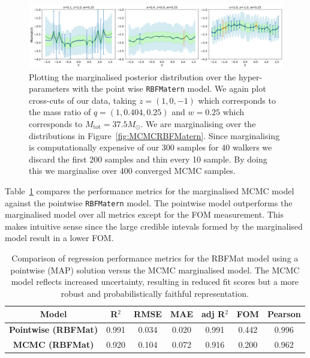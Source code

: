 \documentclass{ucdgradtaughtthesis}
\begin{document}
\begin{figure}[H]
    \centering
    \includegraphics[width=1\textwidth]{LatexPlots/final_gps_plots/MCMCpointwisecomparison_all.png}
    \caption[Comparing the pointwised  model with an alternative marginalised over its hyper-parmeters.]{Plotting the marginalised posterior distribution over the hyper-parameters with the point wise \texttt{RBFMatern} model. We again plot cross-cuts of our data, taking \(z = (1,0,-1)\) which corresponds to the mass ratio of \(q = (1,0.404,0.25)\) and \(w = 0.25\) which corresponds to \(M_{\text{tot}} = 37.5M_\odot\). We are marginalising over the distributions in Figure~\ref{fig:MCMCRBFMatern}. 
    Since marginalising is computationally expensive of our 300 samples for 40 walkers we discard the first 200 samples and thin every 10 sample. By doing this we marginalise over 400 converged MCMC samples.}
    \label{fig:MCMCvsmarginalised}
\end{figure}
%
Table~\ref{tab:pointwise_vs_mcmc} compares the performance metrics for the marginalised MCMC model against the pointwise \texttt{RBFMatern} model.
The pointwise model outperforms the marginalised model over all metrics except for the FOM measurement. This makes intuitive sense since the large credible intevals
formed by the marginalised model result in a lower FOM. 
% 
\begin{table}[H]
    \centering
    \small
    \renewcommand{\arraystretch}{1.3}
    \begin{tabular}{|c|c|c|c|c|c|c|}
    \hline
    \textbf{Model} & \textbf{R$^2$} & \textbf{RMSE} & \textbf{MAE} & \textbf{adj R$^2$} & \textbf{FOM} & \textbf{Pearson} \\
    \hline
    \textbf{Pointwise (RBFMat)} & 0.991 & 0.034 & 0.020 & 0.991 & 0.442 & 0.996 \\
    \textbf{MCMC (RBFMat)}      & 0.920 & 0.104 & 0.072 & 0.916 & 0.200 & 0.962 \\
    \hline
    \end{tabular}
    \caption[Comparing metrics between the pointwise \texttt{RBFMatern} model and its equivalent model marginalised over the hyper-parameters.]{Comparison of regression performance metrics for the RBFMat model using a pointwise (MAP) solution versus the MCMC marginalised model. The MCMC model reflects increased uncertainty, resulting in reduced fit scores but a more robust and probabilistically faithful representation.}
    \label{tab:pointwise_vs_mcmc}
\end{table}
%
\end{document}
